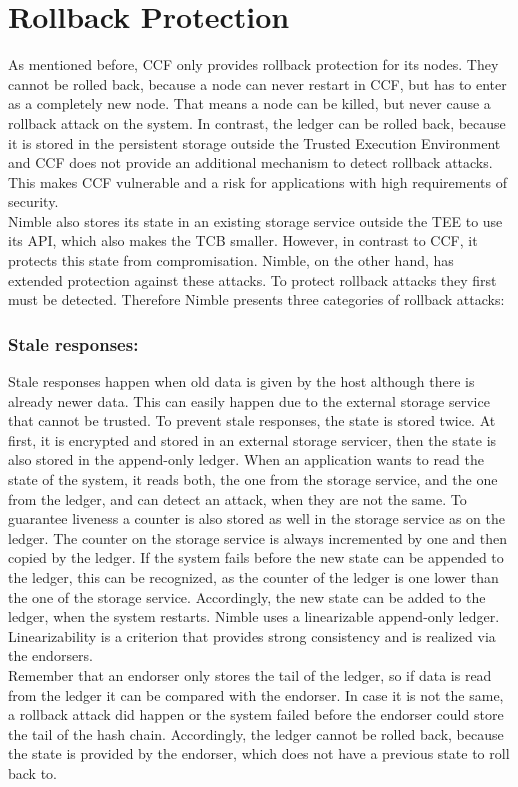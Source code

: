 \section{Rollback Protection}
As mentioned before, CCF only provides rollback protection for its nodes. They cannot be rolled back, because a node can never restart in CCF, but has to enter as a completely new node. That means a node can be killed, but never cause a rollback attack on the system. In contrast, the ledger can be rolled back, because it is stored in the persistent storage outside the Trusted Execution Environment and CCF does not provide an additional mechanism to detect rollback attacks. This makes CCF vulnerable and a risk for applications with high requirements of security.\\
 Nimble also stores its state in an existing storage service outside the TEE to use its API, which also makes the TCB smaller. However, in contrast to CCF, it protects this state from compromisation. Nimble, on the other hand, has extended protection against these attacks. To protect rollback attacks they first must be detected. Therefore Nimble presents three categories of rollback attacks:
	\subsubsection*{Stale responses:} Stale responses happen when old data is given by the host although there is already newer data. This can easily happen due to the external storage service that cannot be trusted. To prevent stale responses, the state is stored twice. At first, it is encrypted and stored in an external storage servicer, then the state is also stored in the append-only ledger. When an application wants to read the state of the system, it reads both, the one from the storage service, and the one from the ledger, and can detect an attack, when they are not the same. To guarantee liveness a counter is also stored as well in the storage service as on the ledger. The counter on the storage service is always incremented by one and then copied by the ledger. If the system fails before the new state can be appended to the ledger, this can be recognized, as the counter of the ledger is one lower than the one of the storage service. Accordingly, the new state can be added to the ledger, when the system restarts. Nimble uses a linearizable append-only ledger. Linearizability is a criterion that provides strong consistency and is realized via the endorsers.\\
	 Remember that an endorser only stores the tail of the ledger, so if data is read from the ledger it can be compared with the endorser. In case it is not the same, a rollback attack did happen or the system failed before the endorser could store the tail of the hash chain. Accordingly, the ledger cannot be rolled back, because the state is provided by the endorser, which does not have a previous state to roll back to. 
